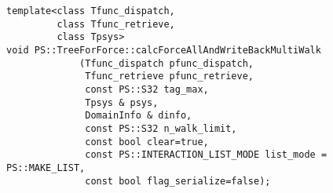 \label{sec:module_standard_treeforforce_calcforceallandwritebackmultiwalk}

\begin{screen}
\begin{verbatim}
template<class Tfunc_dispatch,
         class Tfunc_retrieve,
         class Tpsys>
void PS::TreeForForce::calcForceAllAndWriteBackMultiWalk
             (Tfunc_dispatch pfunc_dispatch,
              Tfunc_retrieve pfunc_retrieve,
              const PS::S32 tag_max,
              Tpsys & psys,
              DomainInfo & dinfo,
              const PS::S32 n_walk_limit,
              const bool clear=true,
              const PS::INTERACTION_LIST_MODE list_mode = PS::MAKE_LIST,
              const bool flag_serialize=false);
\end{verbatim}
\end{screen}

